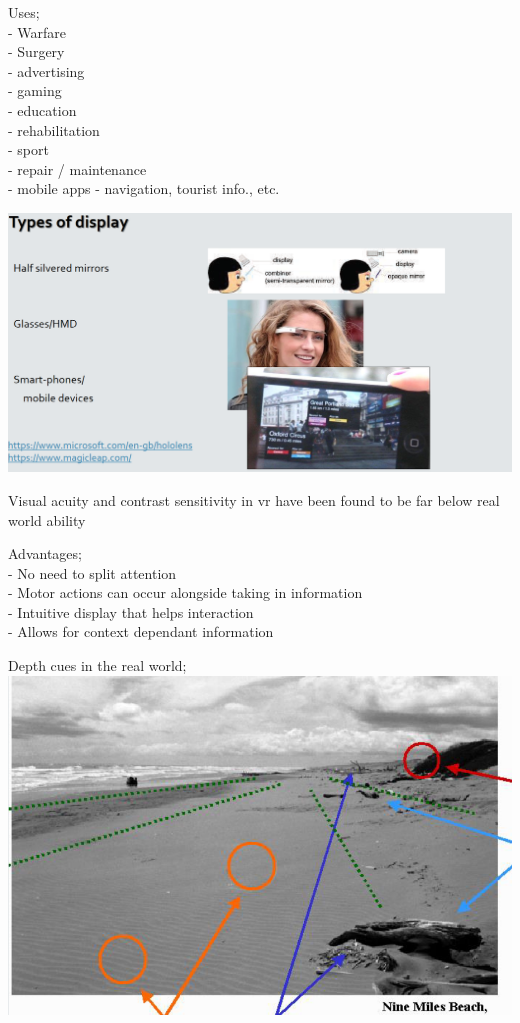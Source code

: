 \documentclass[]{project_plan}
\begin{document}
Uses;\\
- Warfare\\
- Surgery\\
- advertising\\
- gaming\\
- education\\
- rehabilitation\\
- sport\\
- repair / maintenance\\
- mobile apps - navigation, tourist info., etc.

\includegraphics[width=\linewidth]{types_of_ar_display.png}

Visual acuity and contrast sensitivity in vr have been found to be far below real world ability

Advantages;\\
- No need to split attention\\
- Motor actions can occur alongside taking in information\\
- Intuitive display that helps interaction\\
- Allows for context dependant information

\newpage

Depth cues in the real world;\\
\includegraphics[width=\linewidth]{depth_cues_real.png}
\end{document}

